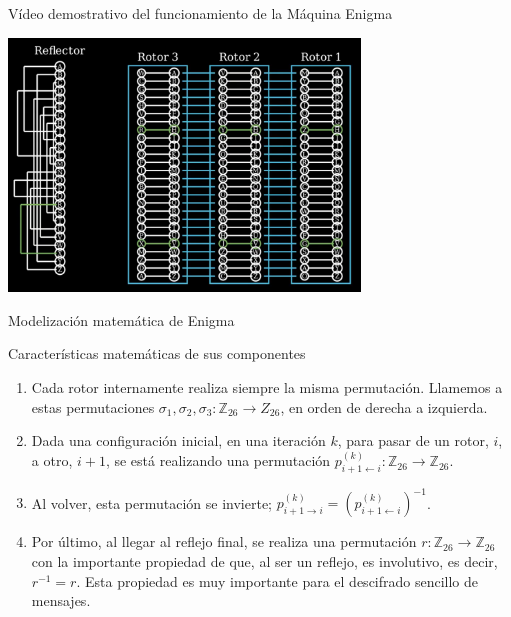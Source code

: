 \documentclass[aspectratio=169]{beamer}
\begin{document}
\begin{frame}{Vídeo demostrativo del funcionamiento de la Máquina Enigma}

    \begin{center}
        \href{https://drive.google.com/file/d/1BkQ4bM_GbFqefPEDQ3nXsJCX1MAV7sGi/view?usp=sharing}{\includegraphics[width=0.7\textwidth,height=0.7\textheight,keepaspectratio]{pic/video-placeholder.png}}
    \end{center}
\end{frame}

\begin{frame}{Modelización matemática de Enigma}
    \begin{block}{Características matemáticas de sus componentes}
        \begin{enumerate}
         \pause \item 
        Cada rotor internamente realiza siempre la misma permutación. Llamemos a estas permutaciones $\sigma_1, \sigma_2, \sigma_3:\mathbb Z_{26} \rightarrow Z_{26}$, en orden de derecha a izquierda.
         \pause \item
        Dada una configuración inicial, en una iteración $k$, para pasar de un rotor, $i$, a otro, $i+1$, se está realizando una permutación $p^{(k)}_{i+1\leftarrow i}:\mathbb Z_{26} \rightarrow \mathbb Z_{26}$.
         \pause \item 
        Al volver, esta permutación se invierte; $p^{(k)}_{i+1\rightarrow i} = (p^{(k)}_{i+1\leftarrow i})^{-1}$.
         \pause \item        
        Por último, al llegar al reflejo final, se realiza una permutación $r:\mathbb Z_{26} \rightarrow \mathbb Z_{26}$ con la importante propiedad de que, al ser un reflejo, es involutivo, es decir, $r^{-1} = r$. Esta propiedad es muy importante para el descifrado sencillo de mensajes.
        
        \end{enumerate}
    \end{block}
\end{frame}
\end{document}
